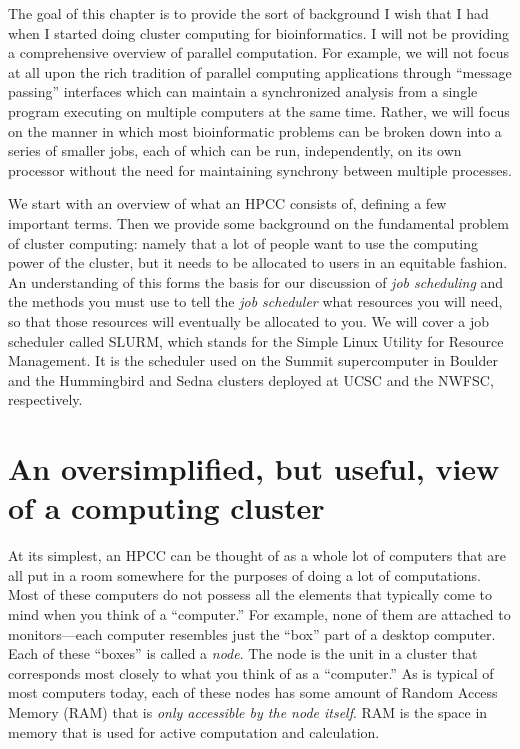 \documentclass[]{krantz}
\begin{document}
The goal of this chapter is to provide the sort of background I wish that I had
when I started doing cluster computing for bioinformatics. I will not be providing
a comprehensive overview of parallel computation. For example, we will not focus at all
upon the rich tradition of parallel computing applications through ``message passing'' interfaces which
can maintain a synchronized analysis from a single program executing
on multiple computers at the same time. Rather, we will focus on the manner in which
most bioinformatic problems can be broken down into a series of smaller jobs,
each of which can be run, independently, on its own processor without the
need for maintaining synchrony between multiple processes.

We start with an overview of what an HPCC consists of, defining a few important
terms. Then we provide some background on the fundamental problem of cluster
computing: namely that a lot of people want to use the computing power of the cluster,
but it needs to be allocated to users in an equitable fashion. An understanding of this
forms the basis for our discussion of \emph{job scheduling} and the methods you must
use to tell the \emph{job scheduler} what resources you will need, so that those resources
will eventually be allocated to you. We will cover a job scheduler called SLURM, which
stands for the Simple Linux Utility for Resource Management. It is the scheduler used
on the Summit supercomputer in Boulder and the Hummingbird and Sedna clusters deployed
at UCSC and the NWFSC, respectively.

\hypertarget{an-oversimplified-but-useful-view-of-a-computing-cluster}{%
\section{An oversimplified, but useful, view of a computing cluster}\label{an-oversimplified-but-useful-view-of-a-computing-cluster}}

At its simplest, an HPCC can be thought of as a whole lot of computers that are all
put in a room somewhere for the purposes of doing a lot of computations. Most of these
computers do not possess all the elements that typically come to mind when you
think of a ``computer.'' For example, none of them are attached to monitors---each
computer resembles just the ``box'' part of a desktop computer. Each of these ``boxes'' is called
a \emph{node}. The node is the unit in a cluster that corresponds most closely to what you think of
as a ``computer.'' As is typical of most computers today, each of these nodes has some
amount of Random Access Memory (RAM) that is \emph{only accessible by the node itself}. RAM
is the space in memory that is used for active computation and calculation.
\end{document}
